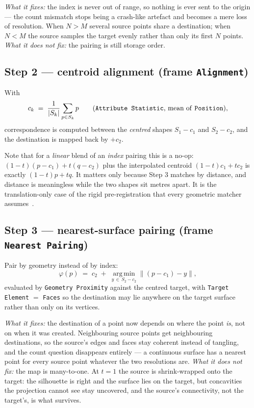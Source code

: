 \documentclass[11pt,a4paper]{article}
\newcommand{\src}{S_1}
\newcommand{\dst}{S_2}
\newcommand{\node}[1]{\texttt{#1}}
\begin{document}
\emph{What it fixes:} the index is never out of range, so nothing is ever
sent to the origin --- the count mismatch stops being a crash-like artefact
and becomes a mere loss of resolution. When $N > M$ several source points
share a destination; when $N < M$ the source samples the target evenly
rather than only its first $N$ points.
\emph{What it does not fix:} the pairing is still storage order.

\subsection*{Step 2 --- centroid alignment (frame \node{Alignment})}

With
\[
  c_k \;=\; \frac{1}{|S_k|}\sum_{p \in S_k} p
  \qquad (\text{\node{Attribute Statistic}, mean of \node{Position}}),
\]
correspondence is computed between the \emph{centred} shapes
$\src - c_1$ and $\dst - c_2$, and the destination is mapped back by $+c_2$.

Note that for a \emph{linear} blend of an \emph{index} pairing this is a
no-op: $(1-t)(p-c_1) + t(q-c_2)$ plus the interpolated centroid
$(1-t)c_1+tc_2$ is exactly $(1-t)p+tq$. It matters only because Step 3
matches by distance, and distance is meaningless while the two shapes sit
metres apart. It is the translation-only case of the rigid pre-registration
that every geometric matcher assumes~\cite{besl1992}.

\subsection*{Step 3 --- nearest-surface pairing (frame \node{Nearest Pairing})}

Pair by geometry instead of by index:
\begin{equation}
  \varphi(p) \;=\;
  c_2 \;+\; \operatorname*{arg\,min}_{y \,\in\, \dst - c_2}
  \bigl\| (p - c_1) - y \bigr\| ,
  \label{eq:proximity}
\end{equation}
evaluated by \node{Geometry Proximity} against the centred target, with
\node{Target Element} $=$ \node{Faces} so the destination may lie anywhere
on the target surface rather than only on its vertices.

\emph{What it fixes:} the destination of a point now depends on where the
point \emph{is}, not on when it was created. Neighbouring source points get
neighbouring destinations, so the source's edges and faces stay coherent
instead of tangling, and the count question disappears entirely --- a
continuous surface has a nearest point for every source point whatever the
two resolutions are.
\emph{What it does not fix:} the map is many-to-one. At $t=1$ the source is
shrink-wrapped onto the target: the silhouette is right and the surface lies
on the target, but concavities the projection cannot see stay uncovered, and
the source's connectivity, not the target's, is what survives.
\end{document}
